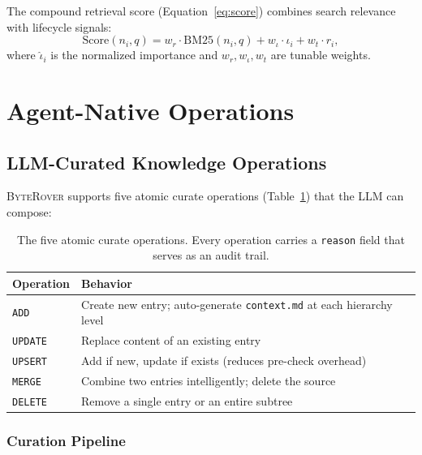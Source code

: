 \documentclass[11pt]{article}
\newcommand{\byterover}{\textsc{ByteRover}}
\begin{document}
The compound retrieval score (Equation~\ref{eq:score}) combines search relevance with lifecycle signals:
\begin{equation}
  \text{Score}(n_i, q) = w_r \cdot \text{BM25}(n_i, q) + w_\iota \cdot \hat{\iota}_i + w_t \cdot r_i,
  \label{eq:score}
\end{equation}
where $\hat{\iota}_i$ is the normalized importance and $w_r, w_\iota, w_t$ are tunable weights.


\section{Agent-Native Operations}
\label{sec:operations}

\subsection{LLM-Curated Knowledge Operations}
\label{sec:curation}

\byterover{} supports five atomic curate operations (Table~\ref{tab:operations}) that the LLM can compose:

\begin{table}[h]
\centering
\small
\begin{tabular}{@{}ll@{}}
\toprule
\textbf{Operation} & \textbf{Behavior} \\
\midrule
\texttt{ADD} & Create new entry; auto-generate \texttt{context.md} at each hierarchy level \\
\texttt{UPDATE} & Replace content of an existing entry \\
\texttt{UPSERT} & Add if new, update if exists (reduces pre-check overhead) \\
\texttt{MERGE} & Combine two entries intelligently; delete the source \\
\texttt{DELETE} & Remove a single entry or an entire subtree \\
\bottomrule
\end{tabular}
\caption{The five atomic curate operations.
  Every operation carries a \texttt{reason} field that serves as an audit trail.}
\label{tab:operations}
\end{table}

\subsubsection{Curation Pipeline}
\end{document}
